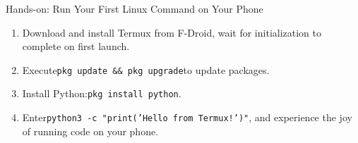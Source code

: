 \begin{tcbpractice}{Hands-on: Run Your First Linux Command on Your Phone}
\begin{enumerate}
  \item Download and install Termux from F-Droid, wait for initialization to complete on first launch.
  \item Execute\texttt{pkg update \&\& pkg upgrade}to update packages.
  \item Install Python:\texttt{pkg install python}.
  \item Enter\texttt{python3 -\allowbreak c "print('Hello from Termux!')"}, and experience the joy of running code on your phone.
\end{enumerate}

\end{tcbpractice}
